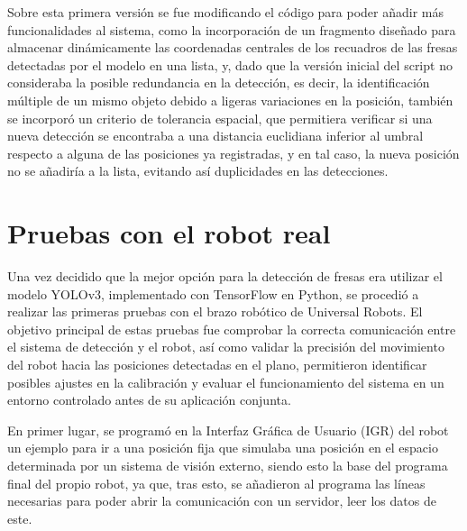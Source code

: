 Sobre esta primera versión se fue modificando el código para poder añadir más funcionalidades al sistema, como la incorporación de un fragmento diseñado para almacenar dinámicamente las coordenadas centrales de los recuadros de las fresas detectadas por el modelo en una lista, y, dado que la versión inicial del script no consideraba la posible redundancia en la detección, es decir, la identificación múltiple de un mismo objeto debido a ligeras variaciones en la posición, también se incorporó un criterio de tolerancia espacial, que permitiera verificar si una nueva detección se encontraba a una distancia euclidiana inferior al umbral respecto a alguna de las posiciones ya registradas, y en tal caso, la nueva posición no se añadiría a la lista, evitando así duplicidades en las detecciones.


\section{Pruebas con el robot real}
\label{Pruebas_UR}

Una vez decidido que la mejor opción para la detección de fresas era utilizar el modelo YOLOv3, implementado con TensorFlow en Python, se procedió a realizar las primeras pruebas con el brazo robótico de Universal Robots. El objetivo principal de estas pruebas fue comprobar la correcta comunicación entre el sistema de detección y el robot, así como validar la precisión del movimiento del robot hacia las posiciones detectadas en el plano, permitieron identificar posibles ajustes en la calibración y evaluar el funcionamiento del sistema en un entorno controlado antes de su aplicación conjunta.

En primer lugar, se programó en la Interfaz Gráfica de Usuario (IGR) del robot un ejemplo para ir a una posición fija que simulaba una posición en el espacio determinada por un sistema de visión externo, siendo esto la base del programa final del propio robot, ya que, tras esto, se añadieron al programa las líneas necesarias para poder abrir la comunicación con un servidor, leer los datos de este.




